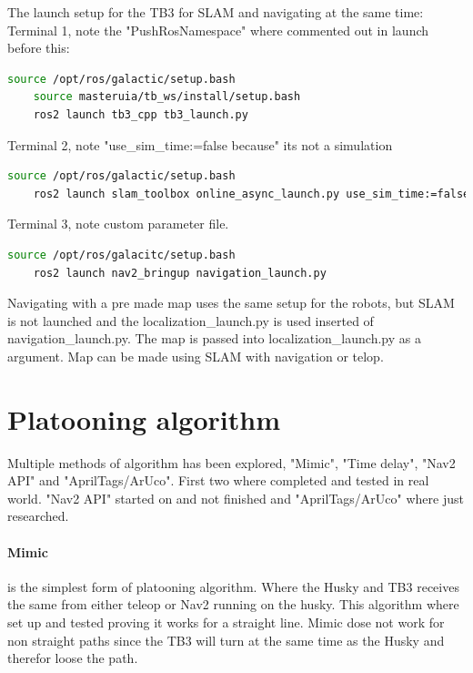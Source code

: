 The launch setup for the TB3 for SLAM and navigating at the same time: 
Terminal 1, note the "PushRosNamespace" where commented out in launch before this: 
\begin{lstlisting}[language=bash]
    source /opt/ros/galactic/setup.bash
    source masteruia/tb_ws/install/setup.bash
    ros2 launch tb3_cpp tb3_launch.py
\end{lstlisting}
Terminal 2, note "use\_sim\_time:=false because" its not a simulation 
\begin{lstlisting}[language=bash]
    source /opt/ros/galactic/setup.bash
    ros2 launch slam_toolbox online_async_launch.py use_sim_time:=false
\end{lstlisting}
Terminal 3, note custom parameter file. 
\begin{lstlisting}[language=bash]
    source /opt/ros/galacitc/setup.bash
    ros2 launch nav2_bringup navigation_launch.py 
\end{lstlisting}

Navigating with a pre made map uses the same setup for the robots, but SLAM is not launched and the localization\_launch.py is used inserted of navigation\_launch.py. The map is passed into localization\_launch.py as a argument. Map can be made using SLAM with navigation or telop. 

\section{Platooning algorithm} \label{Platooning_algorithm}

Multiple methods of algorithm has been explored, "Mimic", "Time delay", "Nav2 API" and "AprilTags/ArUco". First two where completed and tested in real world. "Nav2 API" started on and not finished and "AprilTags/ArUco" where just researched. 

\paragraph{Mimic} is the simplest form of platooning algorithm.  Where the Husky and TB3 receives the same  from either teleop or Nav2 running on the husky.  This algorithm where set up and tested proving it works for a straight line. Mimic dose not work for non straight paths since the TB3 will turn at the same time as the Husky and therefor loose the path.

